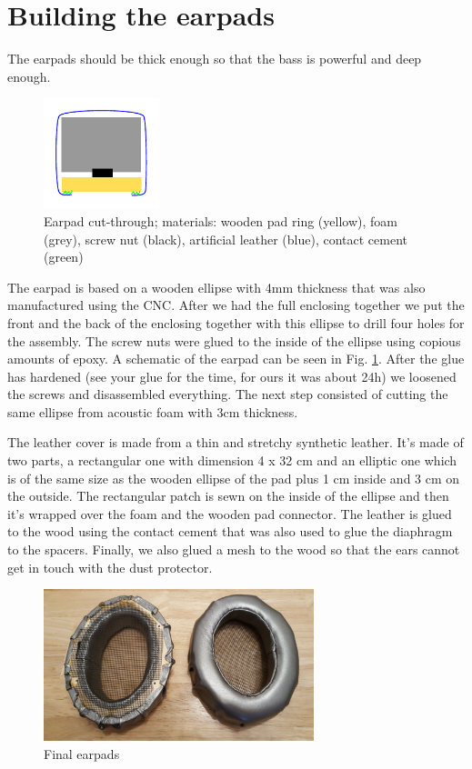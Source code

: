 \documentclass{article}
\begin{document}
\section{Building the earpads}
\label{s:pads}
The earpads should be thick enough so that the bass is powerful and deep enough.
\begin{figure}
\centering
\includegraphics[width=0.3\textwidth]{images/earpad.pdf}
\caption{Earpad cut-through; materials: wooden pad ring (yellow), foam (grey), screw nut (black), artificial leather (blue), contact cement (green)}
\label{f:pads:cut}
\end{figure}
The earpad is based on a wooden ellipse with 4mm thickness that was also manufactured using the CNC. After we had the full enclosing together we put the front and the back of the enclosing together with this ellipse to drill four holes for the assembly. The screw nuts were glued to the inside of the ellipse using copious amounts of epoxy. A schematic of the earpad can be seen in Fig. \ref{f:pads:cut}. After the glue has hardened (see your glue for the time, for ours it was about 24h) we loosened the screws and disassembled everything. The next step consisted of cutting the same ellipse from acoustic foam with 3cm thickness.

The leather cover is made from a thin and stretchy synthetic leather. It's made of two parts, a rectangular one with dimension 4 x 32 cm and an elliptic one which is of the same size as the wooden ellipse of the pad plus 1 cm inside and 3 cm on the outside. The rectangular patch is sewn on the inside of the ellipse and then it's wrapped over the foam and the wooden pad connector. The leather is glued to the wood using the contact cement that was also used to glue the diaphragm to the spacers. Finally, we also glued a mesh to the wood so that the ears cannot get in touch with the dust protector.

\begin{figure}
\centering
\includegraphics[width=0.7\textwidth]{images/earpads_final.jpg}
\caption{Final earpads}
\label{f:pads:final}
\end{figure}
\end{document}
